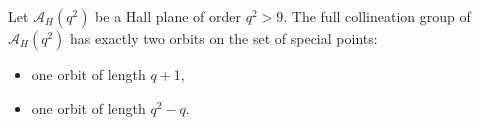 Let $\mathcal{A}_H(q^2)$ be a Hall plane of order $q^2 > 9$. The full collineation group of $\mathcal{A}_H(q^2)$ has exactly two orbits on the set of special points:
\begin{itemize}
\item one orbit of length $q + 1$,
\item one orbit of length $q^2 - q$.
\end{itemize}
